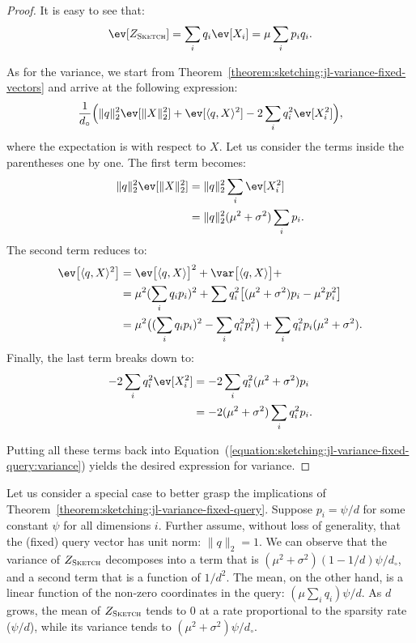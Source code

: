 \begin{proof}
    It is easy to see that:
    \begin{equation*}
        \ev[Z_\textsc{Sketch}] = \sum_i q_i \ev[X_i] = \mu \sum_i p_i q_i.
    \end{equation*}
    
    As for the variance, we start from Theorem~\ref{theorem:sketching:jl-variance-fixed-vectors}
    and arrive at the following expression:
    \begin{equation}
    \label{equation:sketching:jl-variance-fixed-query:variance}
    \frac{1}{d_\circ} \Big( \lVert q \rVert_2^2 \ev[\lVert X \rVert_2^2] + \ev[\langle q, X \rangle^2] - 2 \sum_i q_i^2 \ev[X_i^2]  \Big),
    \end{equation}
    where the expectation is with respect to $X$. Let us consider the terms inside the
    parentheses one by one. The first term becomes:
    \begin{align*}
        \lVert q \rVert_2^2 \ev[\lVert X \rVert_2^2] &= \lVert q \rVert_2^2 \sum_i\ev[X_i^2] \\
        &= \lVert q \rVert_2^2 (\mu^2 + \sigma^2) \sum_i p_i.
    \end{align*}
    The second term reduces to:
    \begin{align*}
    \ev\big[\langle q, X \rangle^2\big] &= \ev\big[ \langle q, X \rangle \big]^2 +
        \var\big[ \langle q, X \rangle \big] + \\
    &= \mu^2 (\sum_i q_i p_i)^2 + \sum q_i^2 \big[ (\mu^2 + \sigma^2) p_i - \mu^2 p_i^2 \big] \\
    &= \mu^2 \big( (\sum_i q_i p_i)^2 - \sum_i q_i^2 p_i^2 \big) + \sum_i q_i^2 p_i (\mu^2 + \sigma^2).
    \end{align*}
    Finally, the last term breaks down to:
    \begin{align*}
    - 2 \sum_i q_i^2 \ev[X_i^2] &= -2 \sum_i q_i^2 (\mu^2 + \sigma^2) p_i \\
    &= -2 (\mu^2 + \sigma^2) \sum_i q_i^2 p_i.
    \end{align*}
    
    Putting all these terms back into Equation~(\ref{equation:sketching:jl-variance-fixed-query:variance}) yields
    the desired expression for variance.
\end{proof}

Let us consider a special case to better grasp the implications of
Theorem~\ref{theorem:sketching:jl-variance-fixed-query}.
Suppose $p_i = \psi / d$ for some constant $\psi$ for all dimensions $i$.
Further assume, without loss of generality, that the (fixed) query vector has
unit norm: $\lVert q \rVert_2 = 1$. We can observe that the
variance of $Z_\textsc{Sketch}$ decomposes into a term that is
$(\mu^2 + \sigma^2) (1 - 1/d) \psi/d_\circ$,
and a second term that is a function of $1/d^2$.
The mean, on the other hand, is a linear function of the non-zero coordinates in the query:
$(\mu \sum_i q_i) \psi/d $.
As $d$ grows, the mean of $Z_\textsc{Sketch}$ tends to $0$ at
a rate proportional to the sparsity rate ($\psi/d$), while its variance tends to
$(\mu^2 + \sigma^2) \psi/d_\circ$.

